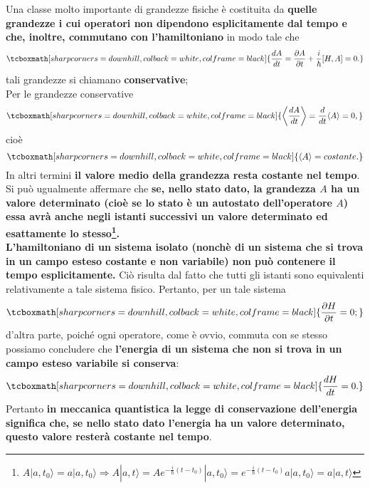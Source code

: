 Una classe molto importante di grandezze fisiche è costituita da \textbf{quelle grandezze i cui operatori non dipendono esplicitamente dal tempo e che, inoltre, commutano con l'hamiltoniano} in modo tale che 
	\begin{equation}
		\tcboxmath[sharp corners=downhill, colback=white, colframe=black]{
			\frac{dA}{dt}= \frac{\partial A}{\partial{t}} + \frac{i}{\hbar}[H,A]=0.
			}
	\end{equation}
tali grandezze si chiamano \textbf{conservative};\\

Per le grandezze conservative 
	\begin{equation} 
		\tcboxmath[sharp corners=downhill, colback=white, colframe=black]{
			\left\langle \frac{dA}{dt}\right\rangle= \frac{d}{dt}\langle A \rangle =0,
			}
	\end{equation}
cioè 
	\begin{equation}
		\tcboxmath[sharp corners=downhill, colback=white, colframe=black]{
			\langle A \rangle= costante.
			}
	\end{equation}
In altri termini \textbf{il valore medio della grandezza resta costante nel tempo}. Si può ugualmente affermare che \textbf{se, nello stato dato, la grandezza $A$ ha un valore determinato (cioè se lo stato è un autostato dell'operatore $A$) essa avrà anche negli istanti successivi un valore determinato ed esattamente lo stesso\footnote{$A| a, t_0\rangle= a |a,t_0\rangle \Rightarrow A|a, t \rangle = Ae^{-\frac{i}{\hbar}(t-t_0)}|a,t_0\rangle=e^{-\frac{i}{\hbar}(t-t_0)}a|a,t_0\rangle=a|a,t\rangle$}.}\\

\textbf{L'hamiltoniano di un sistema isolato (nonchè di un sistema che si trova in un campo esteso costante e non variabile) non può contenere il tempo esplicitamente.} Ciò risulta dal fatto che tutti gli istanti sono equivalenti relativamente a tale sistema fisico. Pertanto, per un tale sistema  
	\begin{equation}
		\tcboxmath[sharp corners=downhill, colback=white, colframe=black]{
			\frac{\partial H}{\partial{t}}=0;
			}
	\end{equation}
d'altra parte, poiché ogni operatore, come è ovvio, commuta con se stesso possiamo concludere che \textbf{l'energia di un sistema che non si trova in un campo esteso variabile si conserva}:
	\begin{equation}
		\tcboxmath[sharp corners=downhill, colback=white, colframe=black]{
			\frac{dH}{dt}=0.
			}
	\end{equation}
Pertanto \textbf{in meccanica quantistica la legge di conservazione dell'energia significa che, se nello stato dato l'energia ha un valore determinato, questo valore resterà costante nel tempo}.

